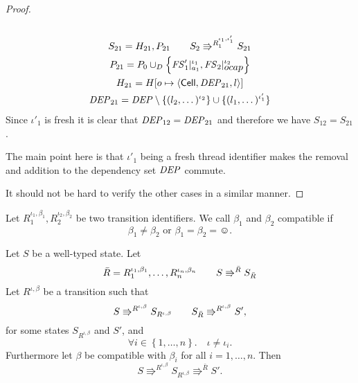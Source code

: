 \begin{proof}
\begin{description}
\begin{equation}
\begin{gathered}
        \end{gathered}
      \end{equation}
      \begin{equation} 
        \begin{gathered}
          S_{21} = H_{21}, P_{21} \quad\quad S_2 \Rrightarrow^{R_1^{\iota_1,
          \iota'_1}} S_{21}
          \\
          P_{21} = P_0 \cup_D \left\{ \mathit{FS}'_1|_{a_1}^{\iota_1},
          \mathit{FS}_2|_{\mbox{$ocap$}}^{\iota_2} \right\} \\
          H_{21} = H[o \mapsto \mbox{$\langle \mbox{$\mathsf{Cell}$}{}, \mathit{DEP}_{21}, l \rangle$}] \\ 
          \mathit{DEP}_{21} = \mathit{DEP} \setminus \{ (l_2, \dots)^{\iota_2} \} \cup \{ (l_1,
          \dots)^{\iota'_1} \} 
        \end{gathered}
      \end{equation}
      Since $\iota'_1$ is fresh it is clear that $\mathit{DEP}_{12} = \mathit{DEP}_{21}$ and
      therefore we have $S_{12} = S_{21}$.
      \begin{remark}
        The main point here is that $\iota'_1$ being a fresh thread identifier
        makes the removal and addition to the dependency set $\mathit{DEP}$ commute.
      \end{remark}
  \end{description}
  It should not be hard to verify the other cases in a similar manner.
\end{proof}

\begin{definition}
  Let $R_1^{\iota_1, \beta_1}, R_2^{\iota_2, \beta_2}$ be two transition
  identifiers. We call $\beta_1$ and $\beta_2$ compatible if
  \begin{equation*}
    \beta_1 \neq \beta_2 \text{ or } \beta_1 = \beta_2 = \smiley.
  \end{equation*}
\end{definition}

\begin{lemma} \label{lem:lemma2}
  Let $S$ be a well-typed state. Let
  \begin{equation*}
    \bar{R} = R_1^{\iota_1, \beta_1}, \dots, R_n^{\iota_n, \beta_n} \quad\quad
    S \Rrightarrow^{\bar{R}} S_{\bar{R}}
  \end{equation*}
  Let $R^{\iota, \beta}$ be a transition such that 
  \begin{equation*}
    S \Rrightarrow^{R^{\iota, \beta}} S_{R^{\iota, \beta}} \quad\quad
    S_{\bar{R}} \Rrightarrow^{R^{\iota, \beta}} S',
  \end{equation*}
  for some states $S_{R^{\iota, \beta}}$ and $S'$, and
  \begin{equation} \label{eq:lemma2_1}
    \forall i \in \left\{ 1, \dots, n \right\}. \quad \iota \neq \iota_i  .
  \end{equation}
  Furthermore let $\beta$ be compatible with $\beta_i$ for all $i = 1, \dots,
  n$.
  Then
  \begin{equation*}
    S \Rrightarrow^{R^{\iota, \beta}} S_{R^{\iota, \beta}} \Rrightarrow^{\bar{R}} S'.
  \end{equation*}
\end{lemma}

